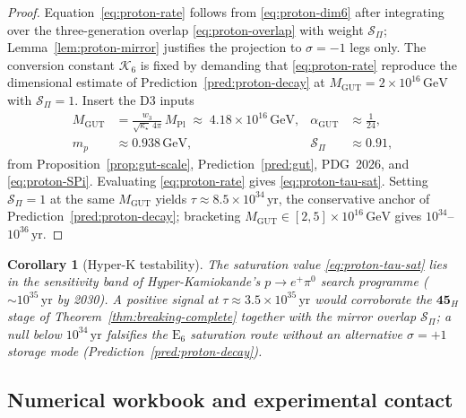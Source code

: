 \documentclass[11pt]{article}
\theoremstyle{plain}
\newtheorem{corollary}[theorem]{Corollary}
\theoremstyle{definition}
\theoremstyle{remark}
\numberwithin{equation}{section}
\newcommand{\E}[1]{\mathrm{E}_{#1}}
\newcommand{\MPl}{M_{\mathrm{Pl}}}
\begin{document}
\begin{proof}
Equation~\eqref{eq:proton-rate} follows from \eqref{eq:proton-dim6} after
integrating over the three-generation overlap \eqref{eq:proton-overlap} with
weight $\mathcal{S}_\Pi$; Lemma~\ref{lem:proton-mirror} justifies the
projection to $\sigma=-1$ legs only. The conversion constant $\mathcal{K}_{6}$
is fixed by demanding that \eqref{eq:proton-rate} reproduce the dimensional
estimate of Prediction~\ref{pred:proton-decay} at
$M_{\mathrm{GUT}}=2\times 10^{16}\,\mathrm{GeV}$ with $\mathcal{S}_\Pi=1$.
Insert the D3 inputs
\begin{align*}
  M_{\mathrm{GUT}}
  &= \frac{w_3}{\sqrt{\kappa_\star}\,4\pi}\,\MPl
   \;\approx\; 4.18\times 10^{16}\,\mathrm{GeV},
  &
  \alpha_{\mathrm{GUT}} &\approx \tfrac{1}{24},
  \\
  m_p &\approx 0.938\,\mathrm{GeV},
  &
  \mathcal{S}_\Pi &\approx 0.91,
\end{align*}
from Proposition~\ref{prop:gut-scale}, Prediction~\ref{pred:gut}, PDG~2026, and
\eqref{eq:proton-SPi}. Evaluating \eqref{eq:proton-rate} gives
\eqref{eq:proton-tau-sat}. Setting $\mathcal{S}_\Pi=1$ at the same
$M_{\mathrm{GUT}}$ yields $\tau\approx 8.5\times 10^{34}\,\mathrm{yr}$, the
conservative anchor of Prediction~\ref{pred:proton-decay}; bracketing
$M_{\mathrm{GUT}}\in[2,5]\times 10^{16}\,\mathrm{GeV}$ gives
$10^{34}$--$10^{36}\,\mathrm{yr}$.
\end{proof}

\begin{corollary}[Hyper-K testability]\label{cor:proton-hyperk}
The saturation value \eqref{eq:proton-tau-sat} lies in the sensitivity band
of Hyper-Kamiokande's $p\to e^+\pi^0$ search programme ($\sim 10^{35}\,\mathrm{yr}$
by 2030). A positive signal at $\tau\approx 3.5\times 10^{35}\,\mathrm{yr}$
would corroborate the $\mathbf{45}_H$ stage of Theorem~\ref{thm:breaking-complete}
together with the mirror overlap $\mathcal{S}_\Pi$; a null below
$10^{34}\,\mathrm{yr}$ falsifies the $\E{6}$ saturation route without an
alternative $\sigma=+1$ storage mode (Prediction~\ref{pred:proton-decay}).
\end{corollary}

\subsection{Numerical workbook and experimental contact}
\label{sec:proton-decay:numerical}
\end{document}
